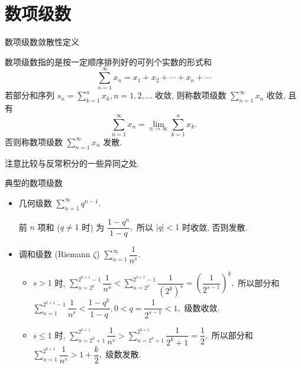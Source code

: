 \section{数项级数}


\begin{frame}{数项级数敛散性定义}

\begin{Def}
数项级数指的是{\color{red}按一定顺序排列好}的可列个实数的形式和
\[\sum\limits_{n=1}^\infty x_n = x_1 + x_2 + \cdots + x_n + \cdots\]
\pause
若部分和序列 $s_n = \sum\limits_{k=1}^n x_k, n = 1, 2, \dots$ 收敛, 则称数项级数 $\sum\limits_{n=1}^\infty x_n$ 收敛, 且有
\[\sum\limits_{n=1}^\infty x_n = \lim\limits_{n\to\infty} \sum\limits_{k=1}^n x_k.\]
否则称数项级数 $\sum\limits_{n=1}^\infty x_n$ 发散.
\end{Def}

\pause

注意比较与反常积分的一些异同之处.

\end{frame}


\begin{frame}{典型的数项级数}

\begin{itemize}[<+->]
\item 几何级数 $\sum\limits_{n=1}^\infty q^{n-1}.$ \par
前 $n$ 项和 ($q \neq 1$ 时) 为 $\dfrac{1-q^n}{1-q},$ 所以 $\lvert q \rvert < 1$ 时收敛, 否则发散.
\item 调和级数 (Riemann $\zeta$) $\sum\limits_{n=1}^\infty \dfrac{1}{n^s}.$
\begin{itemize}
\item $s > 1$ 时, $\sum\limits_{n=2^k}^{2^{k+1}-1} \dfrac{1}{n^s} < \sum\limits_{n=2^k}^{2^{k+1}-1} \dfrac{1}{(2^k)^s} = \left(\dfrac{1}{2^{s-1}}\right)^k,$ 所以部分和 $\sum\limits_{n=1}^{2^{k+1}-1} \dfrac{1}{n^s} < \dfrac{1-q^k}{1-q}, 0 < q = \dfrac{1}{2^{s-1}} < 1,$ 级数收敛.
\item $s \leqslant 1$ 时, $\sum\limits_{n=2^k+1}^{2^{k+1}} \dfrac{1}{n^s} > \sum\limits_{n=2^k+1}^{2^{k+1}} \dfrac{1}{2^k+1} = \dfrac{1}{2},$ 所以部分和 $\sum\limits_{n=1}^{2^{k+1}} \dfrac{1}{n^s} > 1 + \dfrac{k}{2},$ 级数发散.
\end{itemize}
\end{itemize}

\end{frame}

